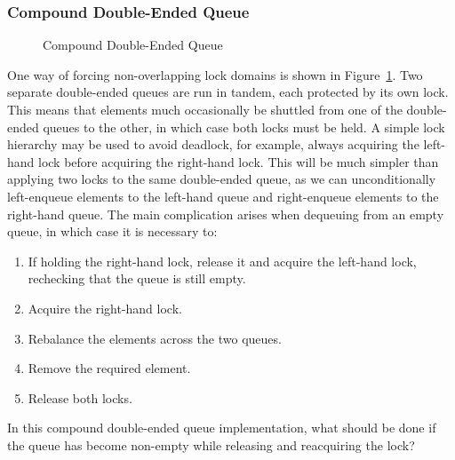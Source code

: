 \subsubsection{Compound Double-Ended Queue}
\label{sec:SMPdesign:Compound Double-Ended Queue}

\begin{figure}[tb]
\begin{center}
\end{center}
\caption{Compound Double-Ended Queue}
\label{fig:SMPdesign:Compound Double-Ended Queue}
\end{figure}

One way of forcing non-overlapping lock domains is shown in
Figure~\ref{fig:SMPdesign:Compound Double-Ended Queue}.
Two separate double-ended queues are run in tandem, each protected by
its own lock.
This means that elements much occasionally be shuttled from one of
the double-ended queues to the other, in which case both locks must
be held.
A simple lock hierarchy may be used to avoid deadlock, for example,
always acquiring the left-hand lock before acquiring the right-hand lock.
This will be much simpler than applying two locks to the same
double-ended queue, as we can unconditionally left-enqueue elements
to the left-hand queue and right-enqueue elements to the right-hand
queue.
The main complication arises when dequeuing from an empty queue, in
which case it is necessary to:

\begin{enumerate}
\item	If holding the right-hand lock, release it and acquire the
	left-hand lock, rechecking that the queue is still empty.
\item	Acquire the right-hand lock.
\item	Rebalance the elements across the two queues.
\item	Remove the required element.
\item	Release both locks.
\end{enumerate}

\QuickQuiz{}
	In this compound double-ended queue implementation, what should
	be done if the queue has become non-empty while releasing
	and reacquiring the lock?
 \QuickQuizEnd

